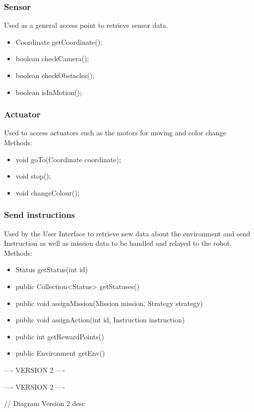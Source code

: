 \subsubsection{Sensor}
Used as a general access point to retrieve sensor data.
	\begin{itemize}
	    \item Coordinate getCoordinate();
	    \item boolean checkCamera();
	    \item boolean checkObstacles();
        \item boolean isInMotion();
	\end{itemize}
    
\subsubsection{Actuator}
Used to access actuators such as the motors for moving and color change
Methods:
\begin{itemize}
    \item void goTo(Coordinate coordinate);
	\item void stop();
	\item void changeColour();
\end{itemize}

\subsubsection{Send instructions}
Used by the User Interface to retrieve new data about the environment and send Instruction as well as mission data to be handled and relayed to the robot.
Methods:
\begin{itemize}
    \item Status getStatus(int id)
    \item public Collection<Status> getStatuses()
    \item public void assignMission(Mission mission, Strategy strategy)
    \item public void assignAction(int id, Instruction instruction)
    \item public int getRewardPoints() 
    \item public Environment getEnv()
\end{itemize}


---- VERSION 2 ----



---- VERSION 2 ----

// Diagram Version 2 desc
